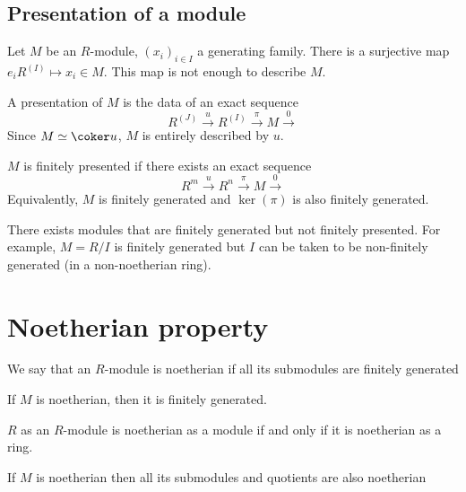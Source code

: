 \subsection{Presentation of a module}

Let $M$ be an $R$-module,  $(x_i)_{i \in  I}$ a generating family. There is a surjective map $e_i R^{(I)} \longmapsto x_i \in  M$. This map is not enough to describe $M$.

A presentation of $M$ is the data of an exact sequence  \[
    R^{(J)} \xrightarrow{u} R^{(I)}\xrightarrow \pi M \xrightarrow 0
\]
Since $M\simeq \coker u$, $M$ is entirely described by $u$.

\begin{dfn}
$M$ is finitely presented if there exists an exact sequence  \[
R^m \xrightarrow u R^n \xrightarrow\pi M \xrightarrow 0
\] 
Equivalently, $M$ is finitely generated and  $\ker (\pi)$ is also finitely generated.
\end{dfn}

\begin{rem}
    There exists modules that are finitely generated but not finitely presented. For example, $M=R / I$ is finitely generated but $I$ can be taken to be non-finitely generated (in a non-noetherian ring).
\end{rem}


\section{Noetherian property}

\begin{dfn}
We say that an $R$-module is noetherian if all its submodules are finitely generated
\end{dfn}

\begin{rem}
    If $M$ is noetherian, then it is finitely generated.  
\end{rem}

\begin{ex}
$R$ as an  $R$-module is noetherian as a module  if and only if it is noetherian as a ring.
\end{ex}

\begin{prop}
If $ M$ is noetherian then all its submodules and quotients are also noetherian
\end{prop}


